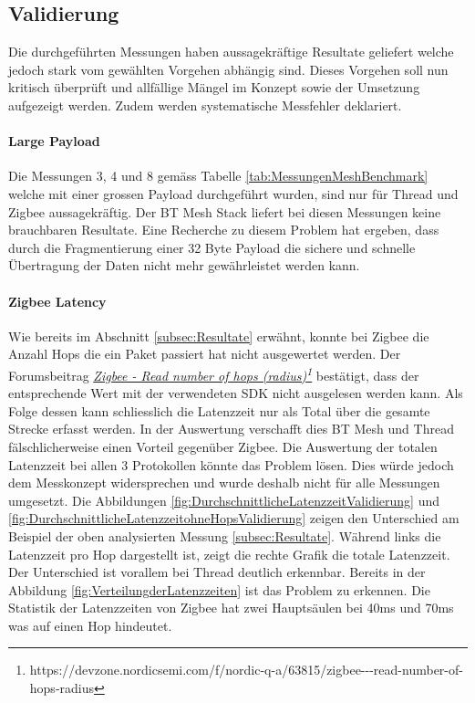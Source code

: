 \subsection{Validierung}\label{subsec:Validierung}
Die durchgeführten Messungen haben aussagekräftige Resultate geliefert welche jedoch stark vom gewählten Vorgehen abhängig sind.
Dieses Vorgehen soll nun kritisch überprüft und allfällige Mängel im Konzept sowie der Umsetzung aufgezeigt werden.
Zudem werden systematische Messfehler deklariert.

\paragraph{Large Payload}
Die Messungen 3, 4 und 8 gemäss Tabelle \ref{tab:MessungenMeshBenchmark} welche mit einer grossen Payload durchgeführt wurden, sind nur für Thread und Zigbee aussagekräftig. Der BT Mesh Stack liefert bei diesen Messungen keine brauchbaren Resultate.
Eine Recherche zu diesem Problem hat ergeben, dass durch die Fragmentierung einer 32 Byte Payload die sichere und schnelle Übertragung der Daten nicht mehr gewährleistet werden kann.

\paragraph{Zigbee Latency}
Wie bereits im Abschnitt \ref{subsec:Resultate} erwähnt, konnte bei Zigbee die Anzahl Hops die ein Paket passiert hat nicht ausgewertet werden.
Der Forumsbeitrag \href{https://devzone.nordicsemi.com/f/nordic-q-a/63815/zigbee---read-number-of-hops-radius}{\textit{Zigbee - Read number of hops (radius)\footnote{\url{https://devzone.nordicsemi.com/f/nordic-q-a/63815/zigbee---read-number-of-hops-radius}}}} bestätigt, dass der entsprechende Wert mit der verwendeten SDK nicht ausgelesen werden kann.
Als Folge dessen kann schliesslich die Latenzzeit nur als Total über die gesamte Strecke erfasst werden. In der Auswertung verschafft dies BT Mesh und Thread fälschlicherweise einen Vorteil gegenüber Zigbee.
Die Auswertung der totalen Latenzzeit bei allen 3 Protokollen könnte das Problem lösen.
Dies würde jedoch dem Messkonzept widersprechen und wurde deshalb nicht für alle Messungen umgesetzt.
Die Abbildungen \ref{fig:DurchschnittlicheLatenzzeitValidierung} und \ref{fig:DurchschnittlicheLatenzzeitohneHopsValidierung} zeigen den Unterschied am Beispiel der oben analysierten Messung \ref{subsec:Resultate}.
Während links die Latenzzeit pro Hop dargestellt ist, zeigt die rechte Grafik die totale Latenzzeit.
Der Unterschied ist vorallem bei Thread deutlich erkennbar.
Bereits in der Abbildung \ref{fig:VerteilungderLatenzzeiten} ist das Problem zu erkennen.
Die Statistik der Latenzzeiten von Zigbee hat zwei Hauptsäulen bei 40ms und 70ms was auf einen Hop hindeutet.



